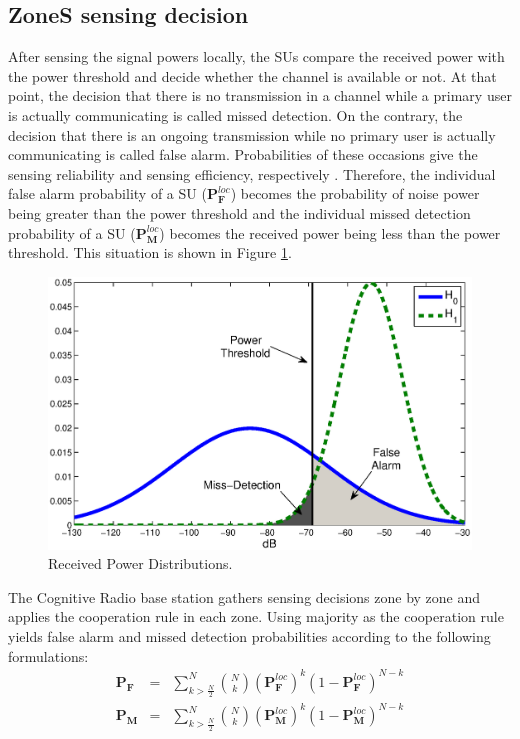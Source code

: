 \documentclass[conference,compsoc]{IEEEtran}
\newcommand{\probf}{\mathbf{P_F}}
\newcommand{\probm}{\mathbf{P_M}}
\newcommand{\probmlocal}{\mathbf{P}_\mathbf{M}^{loc}}
\newcommand{\probflocal}{\mathbf{P}_\mathbf{F}^{loc}}
\newcommand{\CR}{Cognitive Radio }
\begin{document}
\subsection{ZoneS sensing decision}
After sensing the signal powers locally, the SUs compare the received power with the power threshold and decide whether the channel is available or not. At that point, the decision that there is no transmission in a channel while a primary user is actually communicating is called missed detection. On the contrary, the decision that there is an ongoing transmission while no primary user is actually communicating is called false alarm. Probabilities of these occasions give the sensing reliability and sensing efficiency, respectively \cite{UpToDateSensing}. Therefore, the individual false alarm probability of a SU ($\probflocal$) becomes the probability of noise power being greater than the power threshold and the individual missed detection probability of a SU ($\probmlocal$) becomes the received power being less than the power threshold. This situation is shown in Figure \ref{fig:h0h1}.
\begin{figure}[!htb]
\centering
\includegraphics[width=0.99\columnwidth,keepaspectratio] {figs/h0_h1.eps}
\caption{Received Power Distributions.}
\label{fig:h0h1}
\end{figure}

The \CR base station gathers sensing decisions zone by zone and applies the cooperation rule in each zone. Using majority as the cooperation rule yields false alarm and missed detection probabilities according to the following formulations:
\begin{equation}
    \begin{array}{lcl}
        \probf & = & \sum\limits_{ k > \frac{N}{2}}^N {N \choose k}(\probflocal)^k(1-\probflocal)^{N-k} \\
        \probm & = & \sum\limits_{ k > \frac{N}{2}}^N {N \choose k}(\probmlocal)^k(1-\probmlocal)^{N-k}
    \end{array}
\end{equation}
\end{document}
